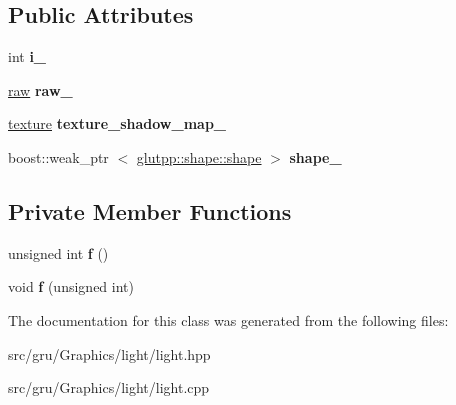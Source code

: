 \subsection*{\-Public \-Attributes}
\begin{DoxyCompactItemize}
\item 
\hypertarget{classglutpp_1_1light_1_1light_afa7e0890ce66350d6adad22282ec4a19}{int {\bfseries i\-\_\-}}\label{classglutpp_1_1light_1_1light_afa7e0890ce66350d6adad22282ec4a19}

\item 
\hypertarget{classglutpp_1_1light_1_1light_ac919169305f5dc46e47073308b1d26e1}{\hyperlink{classglutpp_1_1light_1_1raw}{raw} {\bfseries raw\-\_\-}}\label{classglutpp_1_1light_1_1light_ac919169305f5dc46e47073308b1d26e1}

\item 
\hypertarget{classglutpp_1_1light_1_1light_a514b6b13118418366398118bb47291be}{\hyperlink{classglutpp_1_1texture}{texture} {\bfseries texture\-\_\-shadow\-\_\-map\-\_\-}}\label{classglutpp_1_1light_1_1light_a514b6b13118418366398118bb47291be}

\item 
\hypertarget{classglutpp_1_1light_1_1light_a3f692ac7113fd04fe4ffef57e2e5a9a1}{boost\-::weak\-\_\-ptr\*
$<$ \hyperlink{classglutpp_1_1shape_1_1shape}{glutpp\-::shape\-::shape} $>$ {\bfseries shape\-\_\-}}\label{classglutpp_1_1light_1_1light_a3f692ac7113fd04fe4ffef57e2e5a9a1}

\end{DoxyCompactItemize}
\subsection*{\-Private \-Member \-Functions}
\begin{DoxyCompactItemize}
\item 
\hypertarget{classglutpp_1_1light_1_1light_a77c268feb4c6c59c67bf4cbf898f1efa}{unsigned int {\bfseries f} ()}\label{classglutpp_1_1light_1_1light_a77c268feb4c6c59c67bf4cbf898f1efa}

\item 
\hypertarget{classglutpp_1_1light_1_1light_ae327ffabff39bacdfa6362c4e1104972}{void {\bfseries f} (unsigned int)}\label{classglutpp_1_1light_1_1light_ae327ffabff39bacdfa6362c4e1104972}

\end{DoxyCompactItemize}


\-The documentation for this class was generated from the following files\-:\begin{DoxyCompactItemize}
\item 
src/gru/\-Graphics/light/light.\-hpp\item 
src/gru/\-Graphics/light/light.\-cpp\end{DoxyCompactItemize}
